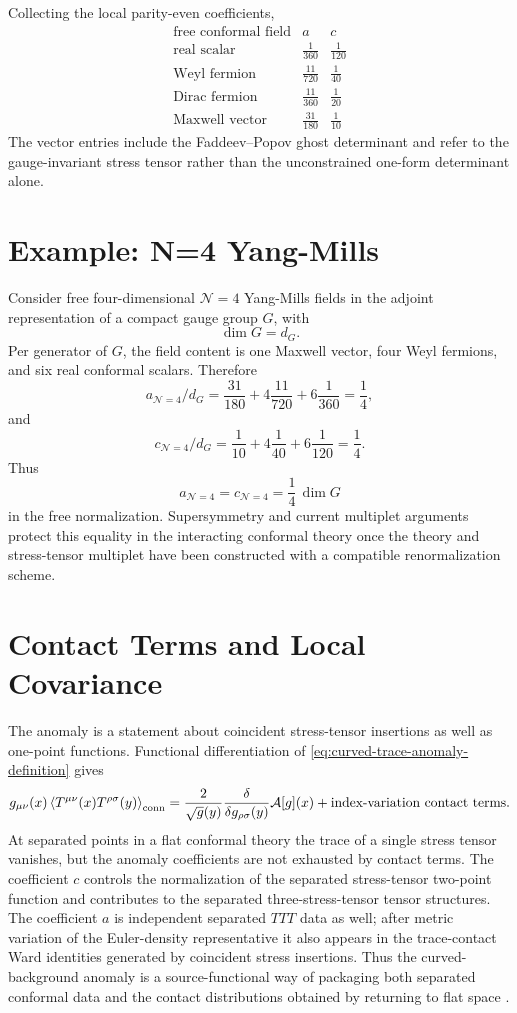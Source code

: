 Collecting the local parity-even coefficients,
\[
\begin{array}{c|cc}
\text{free conformal field} & a & c\\ \hline
\text{real scalar} & \frac{1}{360} & \frac{1}{120}\\[0.2em]
\text{Weyl fermion} & \frac{11}{720} & \frac{1}{40}\\[0.2em]
\text{Dirac fermion} & \frac{11}{360} & \frac{1}{20}\\[0.2em]
\text{Maxwell vector} & \frac{31}{180} & \frac{1}{10}
\end{array}
\]
The vector entries include the Faddeev--Popov ghost determinant and refer to
the gauge-invariant stress tensor rather than the unconstrained one-form
determinant alone.

\section{Example: N=4 Yang-Mills}

Consider free four-dimensional \(\mathcal N=4\) Yang-Mills fields in the
adjoint representation of a compact gauge group \(G\), with
\[
  \dim G=d_G.
\]
Per generator of \(G\), the field content is one Maxwell vector, four Weyl
fermions, and six real conformal scalars.  Therefore
\[
  a_{\mathcal N=4}/d_G
  =
  \frac{31}{180}
  +4\frac{11}{720}
  +6\frac1{360}
  =
  \frac14,
\]
and
\[
  c_{\mathcal N=4}/d_G
  =
  \frac1{10}
  +4\frac1{40}
  +6\frac1{120}
  =
  \frac14.
\]
Thus
\[
  a_{\mathcal N=4}=c_{\mathcal N=4}=\frac14\,\dim G
\]
in the free normalization.  Supersymmetry and current multiplet arguments
protect this equality in the interacting conformal theory once the theory
and stress-tensor multiplet have been constructed with a compatible
renormalization scheme.

\section{Contact Terms and Local Covariance}

The anomaly is a statement about coincident stress-tensor insertions as well
as one-point functions.  Functional differentiation of
\eqref{eq:curved-trace-anomaly-definition} gives
\[
  g_{\mu\nu}(x)
  \left\langle
  T^{\mu\nu}(x)T^{\rho\sigma}(y)
  \right\rangle_{\rm conn}
  =
  \frac{2}{\sqrt g(y)}
  \frac{\delta}{\delta g_{\rho\sigma}(y)}
  \mathcal A[g](x)
  +\text{index-variation contact terms}.
\]
At separated points in a flat conformal theory the trace of a single stress
tensor vanishes, but the anomaly coefficients are not exhausted by contact
terms.  The coefficient \(c\) controls the normalization of the separated
stress-tensor two-point function and contributes to the separated
three-stress-tensor tensor structures.  The coefficient \(a\) is independent
separated \(TTT\) data as well; after metric variation of the Euler-density
representative it also appears in the trace-contact Ward identities generated
by coincident stress insertions.  Thus the curved-background anomaly is a
source-functional way of packaging both separated conformal data and the
contact distributions obtained by returning to flat space
\cite{OsbornPetkou1994,AnselmiFreedmanGrisaruJohansen1998}.

